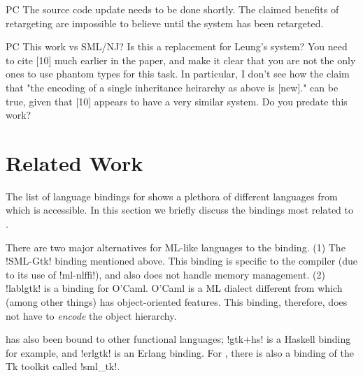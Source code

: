 \documentclass[workingdraft]{usetex-v1}
\begin{document}
\begin{ednote}{PC}
  The source code update needs to be done shortly.  The claimed
  benefits of retargeting are impossible to believe until the system
  has been retargeted.
\end{ednote}


\begin{ednote}{PC}
  This work vs SML/NJ?  Is this a replacement for Leung's
system?  You need to cite [10] much earlier in the paper,
and make it clear that you are not the only ones to use
phantom types for this task.  In particular, I don't see how
the claim that "the encoding of a single inheritance
heirarchy as above is [new]." can be true, given that [10]
appears to have a very similar system.  Do you predate this
work?

\end{ednote}


\section{Related Work}
\label{sec:related-work}

The list of language bindings for \gtk shows a plethora of different
languages from which \gtk is accessible. In this section we briefly
discuss the bindings most related to \mgtk.

There are two major alternatives for ML-like languages to the \mgtk
binding. (1) The !SML-Gtk! binding mentioned above.
This binding is specific to the \smlnj compiler (due to its use of
!ml-nlffi!), and also does not handle
memory management. (2) !lablgtk! is a \gtk binding for O'Caml.
O'Caml is a ML dialect different from \sml which (among other things)
has object-oriented features. This binding, therefore, does not have
to \emph{encode} the \gtk object hierarchy.

\gtk has also been bound to other functional languages;
!gtk+hs! is a Haskell binding for example,
and !erlgtk! is an Erlang binding.
%
For \sml, there is also a binding of the Tk toolkit called
!sml_tk!.
\end{document}
